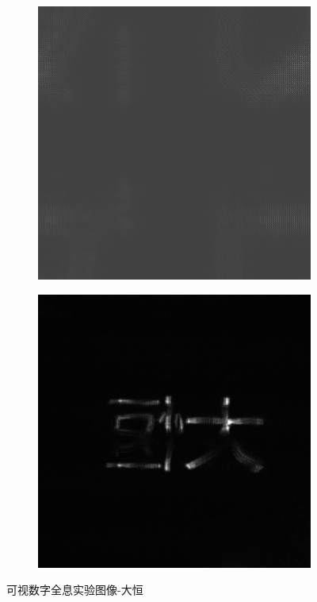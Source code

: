 \documentclass{ctexart}
\begin{document}
\begin{figure}[H]
  \centering
  \begin{subfigure}{.48\textwidth}
    \includegraphics[width=\linewidth]{数字全息实验数据/可视数字全息/实验中使用的全息图-大恒.jpg}
  \end{subfigure}
  \begin{subfigure}{.48\textwidth}
    \includegraphics[width=\linewidth]{数字全息实验数据/可视数字全息/原图-大恒.jpg}
  \end{subfigure}
  \caption{可视数字全息实验图像-大恒}
\end{figure}
\end{document}
